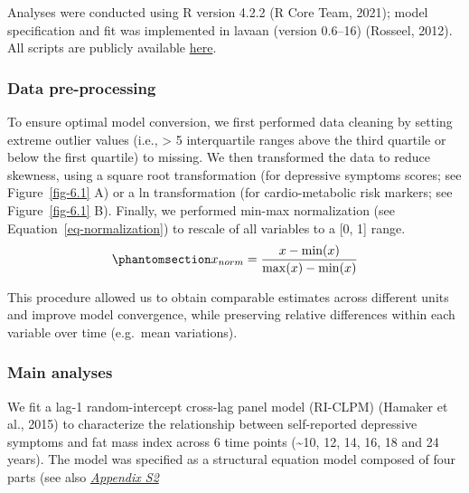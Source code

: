 \documentclass[
  letterpaper,
  DIV=11,
  numbers=noendperiod]{scrreport}
\begin{document}
Analyses were conducted using R version 4.2.2 (R Core Team, 2021); model
specification and fit was implemented in lavaan (version 0.6--16)
(Rosseel, 2012). All scripts are publicly available
\href{https://github.com/SereDef/comorb-longit-project}{here}.

\subsubsection{Data pre-processing}\label{data-pre-processing}

To ensure optimal model conversion, we first performed data cleaning by
setting extreme outlier values (i.e., \textgreater{} 5 interquartile
ranges above the third quartile or below the first quartile) to missing.
We then transformed the data to reduce skewness, using a square root
transformation (for depressive symptoms scores; see Figure~\ref{fig-6.1}
A) or a ln transformation (for cardio-metabolic risk markers; see
Figure~\ref{fig-6.1} B). Finally, we performed min-max normalization
(see Equation~\ref{eq-normalization}) to rescale of all variables to a
{[}0, 1{]} range.
\begin{equation}\phantomsection\label{eq-normalization}{ 
x_{norm} = \frac{x - \min(x)}{\max(x) - \min(x)} 
}\end{equation}

This procedure allowed us to obtain comparable estimates across
different units and improve model convergence, while preserving relative
differences within each variable over time (e.g.~mean variations).

\subsubsection{Main analyses}\label{main-analyses-2}

We fit a lag-1 random-intercept cross-lag panel model (RI-CLPM) (Hamaker
et al., 2015) to characterize the relationship between self-reported
depressive symptoms and fat mass index across 6 time points
(\textasciitilde10, 12, 14, 16, 18 and 24 years). The model was
specified as a structural equation model composed of four parts (see
also
\href{https://osf.io/wyzd8,\%20\%5B*Figure\%20S2*\%5D(https://osf.io/wyzd8)}{\emph{Appendix
S2}}
\end{document}
